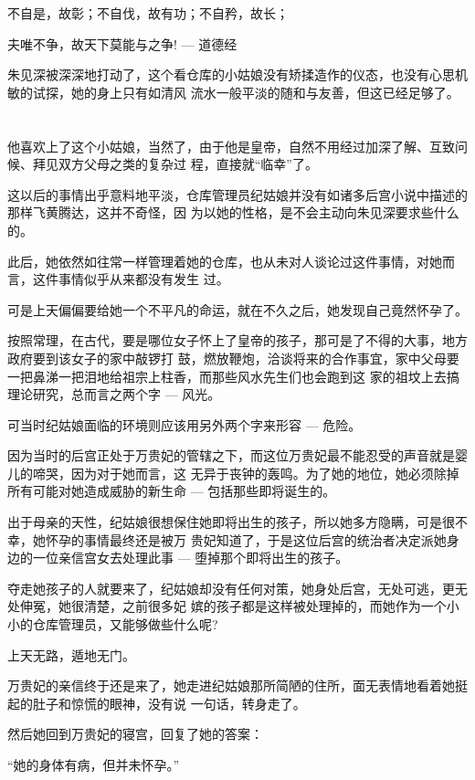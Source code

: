 \documentclass[11pt,a4paper,onecolumn]{article}
\begin{document}
不自是，故彰；不自伐，故有功；不自矜，故长；

夫唯不争，故天下莫能与之争! --- 道德经

朱见深被深深地打动了，这个看仓库的小姑娘没有矫揉造作的仪态，也没有心思机敏的试探，她的身上只有如清风
流水一般平淡的随和与友善，但这已经足够了。

\section[\thesection]{}

他喜欢上了这个小姑娘，当然了，由于他是皇帝，自然不用经过加深了解、互致问候、拜见双方父母之类的复杂过
程，直接就``临幸''了。

这以后的事情出乎意料地平淡，仓库管理员纪姑娘并没有如诸多后宫小说中描述的那样飞黄腾达，这并不奇怪，因
为以她的性格，是不会主动向朱见深要求些什么的。

此后，她依然如往常一样管理着她的仓库，也从未对人谈论过这件事情，对她而言，这件事情似乎从来都没有发生
过。

可是上天偏偏要给她一个不平凡的命运，就在不久之后，她发现自己竟然怀孕了。

按照常理，在古代，要是哪位女子怀上了皇帝的孩子，那可是了不得的大事，地方政府要到该女子的家中敲锣打
鼓，燃放鞭炮，洽谈将来的合作事宜，家中父母要一把鼻涕一把泪地给祖宗上柱香，而那些风水先生们也会跑到这
家的祖坟上去搞理论研究，总而言之两个字 --- 风光。

可当时纪姑娘面临的环境则应该用另外两个字来形容 --- 危险。

因为当时的后宫正处于万贵妃的管辖之下，而这位万贵妃最不能忍受的声音就是婴儿的啼哭，因为对于她而言，这
无异于丧钟的轰鸣。为了她的地位，她必须除掉所有可能对她造成威胁的新生命 --- 包括那些即将诞生的。

出于母亲的天性，纪姑娘很想保住她即将出生的孩子，所以她多方隐瞒，可是很不幸，她怀孕的事情最终还是被万
贵妃知道了，于是这位后宫的统治者决定派她身边的一位亲信宫女去处理此事 --- 堕掉那个即将出生的孩子。

夺走她孩子的人就要来了，纪姑娘却没有任何对策，她身处后宫，无处可逃，更无处伸冤，她很清楚，之前很多妃
嫔的孩子都是这样被处理掉的，而她作为一个小小的仓库管理员，又能够做些什么呢?

上天无路，遁地无门。

万贵妃的亲信终于还是来了，她走进纪姑娘那所简陋的住所，面无表情地看着她挺起的肚子和惊慌的眼神，没有说
一句话，转身走了。

然后她回到万贵妃的寝宫，回复了她的答案：

``她的身体有病，但并未怀孕。''
\end{document}
